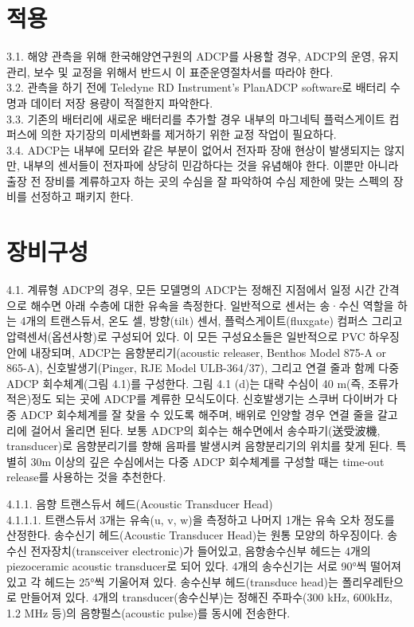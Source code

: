 \documentclass[
]{book}
\begin{document}
\hypertarget{uxc801uxc6a9}{%
\section{적용}\label{uxc801uxc6a9}}

3.1. 해양 관측을 위해 한국해양연구원의 ADCP를 사용할 경우, ADCP의 운영, 유지관리, 보수 및 교정을 위해서 반드시 이 표준운영절차서를 따라야 한다.\\
3.2. 관측을 하기 전에 Teledyne RD Instrument's PlanADCP software로 배터리 수명과 데이터 저장 용량이 적절한지 파악한다.\\
3.3. 기존의 배터리에 새로운 배터리를 추가할 경우 내부의 마그네틱 플럭스게이트 컴퍼스에 의한 자기장의 미세변화를 제거하기 위한 교정 작업이 필요하다.\\
3.4. ADCP는 내부에 모터와 같은 부분이 없어서 전자파 장애 현상이 발생되지는 않지만, 내부의 센서들이 전자파에 상당히 민감하다는 것을 유념해야 한다. 이뿐만 아니라 출장 전 장비를 계류하고자 하는 곳의 수심을 잘 파악하여 수심 제한에 맞는 스펙의 장비를 선정하고 패키지 한다.

\hypertarget{uxc7a5uxbe44uxad6cuxc131-1}{%
\section{장비구성}\label{uxc7a5uxbe44uxad6cuxc131-1}}

4.1. 계류형 ADCP의 경우, 모든 모델명의 ADCP는 정해진 지점에서 일정 시간 간격으로 해수면 아래 수층에 대한 유속을 측정한다. 일반적으로 센서는 송·수신 역할을 하는 4개의 트랜스듀서, 온도 셀, 방향(tilt) 센서, 플럭스게이트(fluxgate) 컴퍼스 그리고 압력센서(옵션사항)로 구성되어 있다. 이 모든 구성요소들은 일반적으로 PVC 하우징 안에 내장되며, ADCP는 음향분리기(acoustic releaser, Benthos Model 875-A or 865-A), 신호발생기(Pinger, RJE Model ULB-364/37), 그리고 연결 줄과 함께 다중 ADCP 회수체계(그림 4.1)를 구성한다. 그림 4.1 (d)는 대략 수심이 40 m(즉, 조류가 적은)정도 되는 곳에 ADCP를 계류한 모식도이다. 신호발생기는 스쿠버 다이버가 다중 ADCP 회수체계를 잘 찾을 수 있도록 해주며, 배위로 인양할 경우 연결 줄을 갈고리에 걸어서 올리면 된다. 보통 ADCP의 회수는 해수면에서 송수파기(送受波機, transducer)로 음향분리기를 향해 음파를 발생시켜 음향분리기의 위치를 찾게 된다. 특별히 30m 이상의 깊은 수심에서는 다중 ADCP 회수체계를 구성할 때는 time-out release를 사용하는 것을 추천한다.

4.1.1. 음향 트랜스듀서 헤드(Acoustic Transducer Head)\\
4.1.1.1. 트랜스듀서 3개는 유속(u, v, w)을 측정하고 나머지 1개는 유속 오차 정도를 산정한다. 송수신기 헤드(Acoustic Transducer Head)는 원통 모양의 하우징이다. 송수신 전자장치(transceiver electronic)가 들어있고, 음향송수신부 헤드는 4개의 piezoceramic acoustic transducer로 되어 있다. 4개의 송수신기는 서로 90°씩 떨어져 있고 각 헤드는 25°씩 기울어져 있다. 송수신부 헤드(transduce head)는 폴리우레탄으로 만들어져 있다. 4개의 transducer(송수신부)는 정해진 주파수(300 kHz, 600kHz, 1.2 MHz 등)의 음향펄스(acoustic pulse)를 동시에 전송한다.
\end{document}
